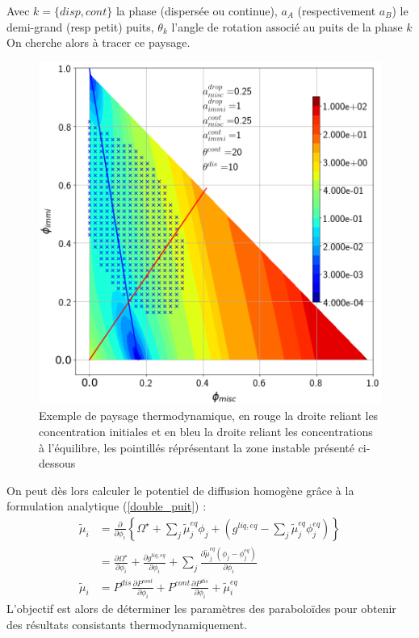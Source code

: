\documentclass[a4paper,11pt,fleqn]{report}    %
\begin{document}
Avec $k = \{disp,cont\}$ la phase (dispersée ou continue), $a_A$ (respectivement $a_B$) le demi-grand (resp petit) puits, $\theta_k$ l'angle de rotation associé au puits de la phase $k$\\
On cherche alors à tracer ce paysage.
\begin{figure}[h!]
	\centering
	\includegraphics[width=0.7\linewidth]{figure/landscape}
	\caption{Exemple de paysage thermodynamique, en rouge la droite reliant les concentration initiales et en bleu la droite reliant les concentrations à l'équilibre, les pointillés réprésentant la zone instable présenté ci-dessous}
	\label{fig:landscape}
\end{figure}
On peut dès lors calculer le potentiel de diffusion homogène grâce à la formulation analytique (\ref{double_puit}) :
\begin{align}
	\tilde{\mu}_i & \nonumber= \frac{\partial}{\partial \phi_i}\left\lbrace 
	\Omega^{\star} + \sum_j \tilde{\mu}_j^{eq}\phi_j + \left( {g}^{liq,eq} -  \sum_j \tilde{\mu}_j^{eq}\phi_j^{eq} \right)\right\rbrace \\
	&\nonumber = \frac{\partial \Omega^{\star}}{\partial \phi_i} + \frac{\partial g^{liq,eq}}{\partial \phi_i} + \sum_j \frac{\partial \tilde{\mu}_j^{eq}\left(\phi_j - \phi_j^{eq}\right)}{\partial  \phi_i}\\
	\tilde{\mu}_i &=	P^{dis}\frac{\partial P^{cont}}{\partial \phi_i} + P^{cont}\frac{\partial P^{dis}}{\partial \phi_i} + \tilde{\mu}_i^{eq}
\end{align} 
L'objectif est alors de déterminer les paramètres des paraboloïdes pour obtenir des résultats consistants thermodynamiquement.
\end{document}
